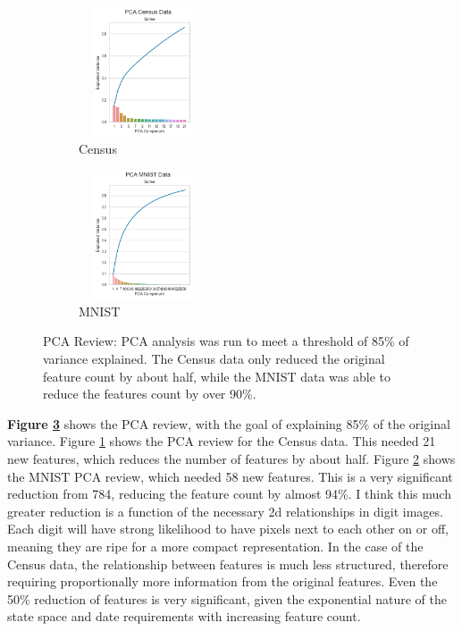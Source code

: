 \documentclass[letterpaper]{article} %
\begin{document}
\begin{figure}[!htb]
	\centering
		\begin{subfigure} [b]{.25\textwidth}
			\centering
			\includegraphics[width=1.5in, height=1.5in]{figures/PCA_Census_Data_Scree_vt_85.png}
			\caption{Census}
			\label{fig:pca_census}
		\end{subfigure}%
		\begin{subfigure}[b]  {.25\textwidth}
			\includegraphics[width=1.5in, height=1.5in]{figures/PCA_MNIST_Data_Scree_vt_85.png}
			\caption{MNIST}
			\label{fig:pca_mnist}
		\end{subfigure}
		\caption{PCA Review:  PCA analysis was run to meet a threshold of 85\% of variance explained.  The Census data only reduced the original feature count by about half, while the MNIST data was able to reduce the features count by over 90\%.}
		\label{fig:pca}
\end{figure}

\textbf{Figure \ref{fig:pca}} shows the PCA review, with the goal of explaining 85\% of the original variance. Figure \ref{fig:pca_census}  shows the PCA review for the Census data.  This needed 21 new features, which reduces the number of features by about half.  Figure \ref{fig:pca_mnist} shows the MNIST PCA review, which needed 58 new features.  This is a very significant reduction from 784, reducing the feature count by almost 94\%.  I think this much greater reduction is a function of the necessary 2d relationships in digit images.  Each digit will have strong likelihood to have pixels next to each other on or off, meaning they are ripe for a more compact representation.  In the case of the Census data, the relationship between features is much less structured, therefore requiring proportionally more information from the original features.  Even the 50\% reduction of features is very significant, given the exponential nature of the state space and date requirements with increasing feature count.
\end{document}
